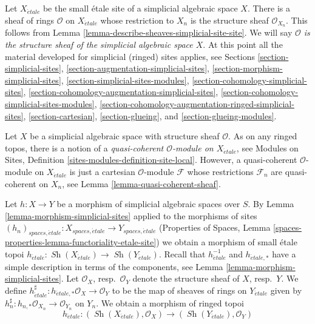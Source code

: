 \documentclass{stacks-project}
\theoremstyle{plain}
\theoremstyle{definition}
\theoremstyle{remark}
\numberwithin{equation}{subsection}
\def\Sh{\mathop{\mathit{Sh}}\nolimits}
\def\etale{{\acute{e}tale}}
\begin{document}
\medskip\noindent
Let $X_\etale$ be the small \'etale site of a simplicial algebraic space $X$.
There is a sheaf of rings $\mathcal{O}$ on $X_\etale$ whose restriction
to $X_n$ is the structure sheaf $\mathcal{O}_{X_n}$. This follows from
Lemma \ref{lemma-describe-sheaves-simplicial-site-site}. We will say
{\it $\mathcal{O}$ is the structure sheaf of the
simplicial algebraic space $X$}.
At this point all the material developed for simplicial (ringed) sites
applies, see Sections \ref{section-simplicial-sites},
\ref{section-augmentation-simplicial-sites},
\ref{section-morphism-simplicial-sites},
\ref{section-simplicial-sites-modules},
\ref{section-cohomology-simplicial-sites},
\ref{section-cohomology-augmentation-simplicial-sites},
\ref{section-cohomology-simplicial-sites-modules},
\ref{section-cohomology-augmentation-ringed-simplicial-sites},
\ref{section-cartesian},
\ref{section-glueing}, and
\ref{section-glueing-modules}.

\medskip\noindent
Let $X$ be a simplicial algebraic space with structure sheaf $\mathcal{O}$.
As on any ringed topos, there is a notion
of a {\it quasi-coherent $\mathcal{O}$-module on $X_\etale$}, see
Modules on Sites, Definition \ref{sites-modules-definition-site-local}.
However, a quasi-coherent $\mathcal{O}$-module on $X_\etale$ is
just a cartesian $\mathcal{O}$-module $\mathcal{F}$ whose restrictions
$\mathcal{F}_n$ are quasi-coherent on $X_n$, see
Lemma \ref{lemma-quasi-coherent-sheaf}.

\medskip\noindent
Let $h : X \to Y$ be a morphism of simplicial algebraic spaces over $S$.
By Lemma \ref{lemma-morphism-simplicial-sites} applied to the morphisms
of sites $(h_n)_{spaces, \etale} : X_{spaces, \etale} \to Y_{spaces, \etale}$
(Properties of Spaces, Lemma
\ref{spaces-properties-lemma-functoriality-etale-site})
we obtain a morphism of small \'etale topoi
$h_\etale : \Sh(X_\etale) \to \Sh(Y_\etale)$.
Recall that $h_\etale^{-1}$ and $h_{\etale, *}$ have a simple
description in terms of the components, see
Lemma \ref{lemma-morphism-simplicial-sites}.
Let $\mathcal{O}_X$, resp.\ $\mathcal{O}_Y$ denote the structure
sheaf of $X$, resp.\ $Y$. We define
$h_\etale^\sharp : h_{\etale, *}\mathcal{O}_X \to \mathcal{O}_Y$
to be the map of sheaves of rings on $Y_\etale$ given by
$h_n^\sharp : h_{n, *}\mathcal{O}_{X_n} \to \mathcal{O}_{Y_n}$ on $Y_n$.
We obtain a morphism of ringed topoi
$$
h_\etale :
(\Sh(X_\etale), \mathcal{O}_X)
\longrightarrow
(\Sh(Y_\etale), \mathcal{O}_Y)
$$
\end{document}
